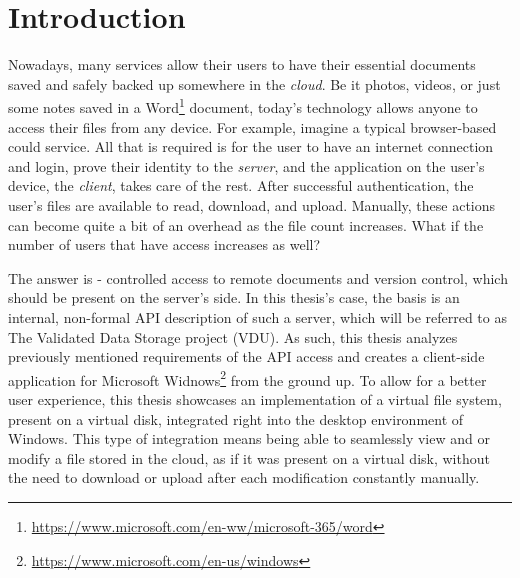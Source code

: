 
\chapter{Introduction}
\label{ch1}

Nowadays, many services allow their users to have their essential documents saved and safely backed up somewhere in the \textit{cloud}. Be it photos, videos, or just some notes saved in a Word\footnote{\url{https://www.microsoft.com/en-ww/microsoft-365/word}} document, today's technology allows anyone to access their files from any device. For example, imagine a typical browser-based could service. All that is required is for the user to have an internet connection and login, prove their identity to the \textit{server}, and the application on the user's device, the \textit{client}, takes care of the rest. After successful authentication, the user's files are available to read, download, and upload. Manually, these actions can become quite a bit of an overhead as the file count increases. What if the number of users that have access increases as well? 

The answer is - controlled access to remote documents and version control, which should be present on the server's side. In this thesis's case, the basis is an internal, non-formal API description of such a server, which will be referred to as The Validated Data Storage project (VDU). As such, this thesis analyzes previously mentioned requirements of the API access and creates a client-side application for Microsoft Widnows\footnote{\url{https://www.microsoft.com/en-us/windows}} from the ground up. To allow for a better user experience, this thesis showcases an implementation of a virtual file system, present on a virtual disk, integrated right into the desktop environment of Windows. This type of integration means being able to seamlessly view and or modify a file stored in the cloud, as if it was present on a virtual disk, without the need to download or upload after each modification constantly manually. 

